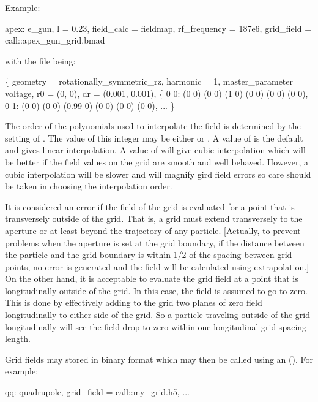 Example:
\begin{example}
  apex: e_gun, l = 0.23, field_calc = fieldmap, rf_frequency = 187e6, 
                                  grid_field = call::apex_gun_grid.bmad
\end{example}
with the file  being:
\begin{example}
  \{
    geometry = rotationally_symmetric_rz,
    harmonic = 1,
    master_parameter = voltage,
    r0 = (0, 0),
    dr = (0.001, 0.001),
    \{
    0 0:  (0 0) (0 0) (1 0)     (0 0) (0 0) (0 0),
    0 1:  (0 0) (0 0) (0.99 0)  (0 0) (0 0) (0 0),
    ... \}
\end{example}

The order of the polynomials used to interpolate the field is determined by the setting of
. The value of this integer may be either  or . A value of
 is the default and gives linear interpolation.  A value of  will give cubic
interpolation which will be better if the field values on the grid are smooth and well behaved.
However, a cubic interpolation will be slower and will magnify gird field errors so care should be
taken in choosing the interpolation order.

It is considered an error if the field of the grid is evaluated for a point that is transversely
outside of the grid. That is, a grid must extend transversely to the aperture or at least beyond the
trajectory of any particle. [Actually, to prevent problems when the aperture is set at the grid
boundary, if the distance between the particle and the grid boundary is within 1/2 of the spacing
between grid points, no error is generated and the field will be calculated using extrapolation.] On
the other hand, it is acceptable to evaluate the grid field at a point that is longitudinally
outside of the grid. In this case, the field is assumed to go to zero. This is done by effectively
adding to the grid two planes of zero field longitudinally to either side of the grid. So a particle
traveling outside of the grid longitudinally will see the field drop to zero within one longitudinal
grid spacing length.

Grid fields may stored in  binary format which may then be called using an 
(). For example:
\begin{example}
  qq: quadrupole, grid_field = call::my_grid.h5, ...
\end{example}

